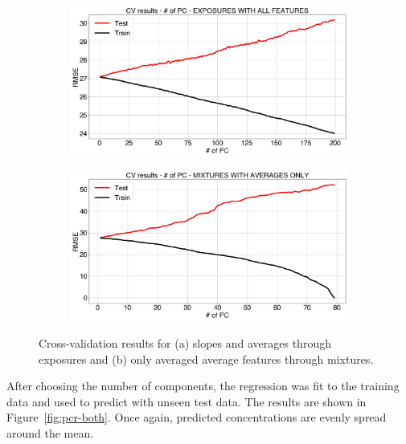\begin{figure}[!htb]
	\centering
	
	\begin{subfigure}[t]{0.5\textwidth}
		\includegraphics[width=1\linewidth]{../figures/pcr-cv.png}
		\caption{}
		\label{fig:pcr-cv} 
	\end{subfigure}
	
	\begin{subfigure}[t]{0.5\textwidth}
		\includegraphics[width=1\linewidth]{../figures/pcr-cv-avg-feat.png}
		\caption{}
		\label{fig:pcr-cv-averaged}
	\end{subfigure}
	
	\caption{Cross-validation results for (a) slopes and averages through exposures and (b) only averaged average features through mixtures.}
	\label{fig:pcr-cv-both}
\end{figure}

After choosing the number of components, the regression was fit to the training data and used to predict with unseen test data. The results are shown in Figure~\ref{fig:pcr-both}. Once again, predicted concentrations are evenly spread around the mean.

